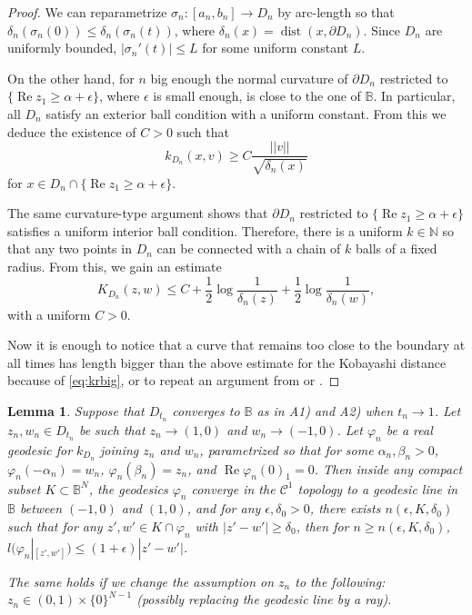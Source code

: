 \documentclass[a4paper,12pt]{amsart}
\def\re{\operatorname{Re}}
\def\dist{\operatorname{dist}}
\newtheorem{lemma}[theorem]{Lemma}
\theoremstyle{remark}\newtheorem{remark}[theorem]{Remark}
\begin{document}
\begin{proof}

We can reparametrize $\sigma_n:[a_n,b_n]\to D_n$ by arc-length so that $\delta_n(\sigma_n (0))\leq \delta_n (\sigma_n(t))$, where $\delta_n(x)=\dist (x, \partial D_n)$. Since $D_n$ are uniformly bounded, $|\sigma_n'(t)|\leq L$ for some uniform constant $L$.

On the other hand, for $n$ big enough the normal curvature of $\partial D_n$ restricted to $\{\re z_1 \geq \alpha +\epsilon\}$, where $\epsilon$ is small enough, is close to the one of $\mathbb B$. In particular, all $D_n$ satisfy an exterior ball condition with a uniform constant. From this we deduce the existence of $C>0$ such that \begin{equation}
\label{eq:krbig}
    k_{D_n}(x, v)\geq C \frac{||v||}{\sqrt{\delta_n(x)}}
\end{equation}
for $x\in D_n\cap \{\re z_1 \geq \alpha + \epsilon\}$.

The same curvature-type argument shows that $\partial D_n$ restricted to $\{\re z_1 \geq \alpha +\epsilon\}$ satisfies a uniform interior ball condition. Therefore, there is a uniform $k\in \mathbb N$ so that any two points in $D_n$ can be connected with a chain of $k$ balls of a fixed radius. From this, we gain an estimate 
$$K_{D_n}(z,w)\leq C + \frac 12 \log \frac{1}{\delta_n(z)} + \frac12 \log \frac{1}{\delta_n(w)}, $$ with a uniform $C>0$. 

Now it is enough to notice that a curve that remains too close to the boundary at all times
has length bigger than the above estimate for the Kobayashi distance because of \eqref{eq:krbig}, or to
repeat an argument from \cite[Proof of Proposition 2.2]{BFW} or \cite[Section 5]{BZ}.
\end{proof}

\begin{lemma}\label{lem:claim}
Suppose that $D_{t_n}$ converges to $\mathbb B$ as in A1) and A2) when $t_n\to 1$. Let $z_n,w_n\in D_{t_n}$ be such that $z_n\to (1,0)$ and $w_n\to (-1,0)$. Let $\varphi_n$ be a real geodesic for $k_{D_n}$ joining $z_n$ and $w_n$, parametrized so that for some $\alpha_n,
\beta_n >0$, $\varphi_n(-\alpha_n)=w_n$, $\varphi_n(\beta_n)=z_n$,
and $\re \varphi_n(0)_1=0$.
Then inside any compact subset $K\subset \mathbb B^N$,
the geodesics $\varphi_n$ converge  in the $\mathcal C^1$ topology to a geodesic line in $\mathbb B$ between $(-1,0)$ and $(1,0)$, and for any $\epsilon, \delta_0>0$, there exists
$n(\epsilon,K,\delta_0)$ such that for any $z',w' \in K\cap \varphi_n$ 
with $|z'-w'|\ge \delta_0$, then for $n\ge n(\epsilon,K,\delta_0)$,
$l(\varphi_n|_{[z',w']})\le (1+\epsilon)|z'-w'|$.

The same holds if we change the assumption on $z_n$ to the following: $z_n\in (0,1)\times \{0\}^{N-1}$ (possibly replacing the geodesic line by a ray).
\end{lemma}
\end{document}
